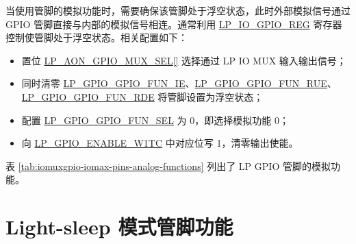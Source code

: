 \documentclass[main\_\_CN.tex]{subfiles}
\begin{document}
当使用管脚的模拟功能时，需要确保该管脚处于浮空状态，此时外部模拟信号通过 GPIO 管脚直接与内部的模拟信号相连。通常利用 \hyperref[regdesc:LPIOGPIONREG]{LP\_IO\_GPIO\_REG} 寄存器控制使管脚处于浮空状态。相关配置如下：

\begin{itemize}
    \item 置位 \hyperref[fielddesc:LPAONGPIOMUXSEL]{LP\_AON\_GPIO\_MUX\_SEL[]} 选择通过 LP IO MUX 输入输出信号；
    \item 同时清零 \hyperref[regdesc:LPIOGPIONREG]{LP\_GPIO\_GPIO\_FUN\_IE}、\hyperref[regdesc:LPIOGPIONREG]{LP\_GPIO\_GPIO\_FUN\_RUE}、\hyperref[regdesc:LPIOGPIONREG]{LP\_GPIO\_GPIO\_FUN\_RDE} 将管脚设置为浮空状态；
    \item 配置 \hyperref[regdesc:LPIOGPIONREG]{LP\_GPIO\_GPIO\_FUN\_SEL} 为 0，即选择模拟功能 0；

    \item 向 \hyperref[regdesc:LPIOENABLEW1TCREG]{LP\_GPIO\_ENABLE\_W1TC} 中对应位写 1，清零输出使能。
\end{itemize}
表 \ref{tab:iomuxgpio-iomax-pins-analog-functions} 列出了 LP GPIO 管脚的模拟功能。


\section{Light-sleep 模式管脚功能}\label{sec:iomuxgpio-pin-func-light-sleep}
\end{document}

